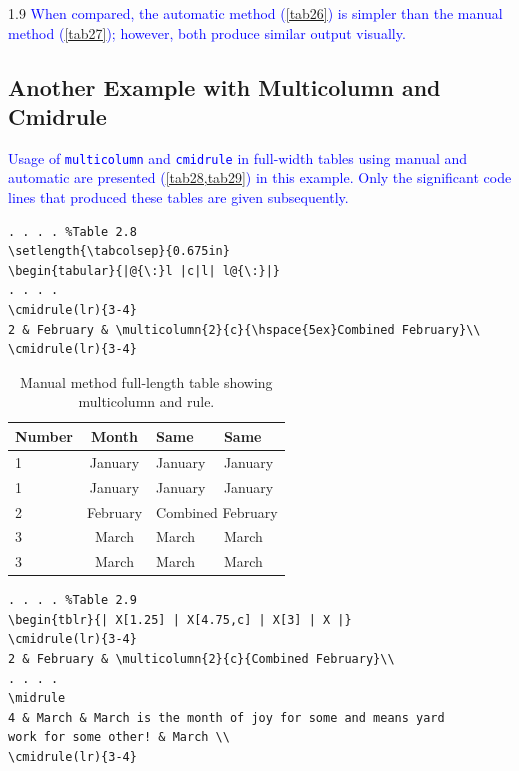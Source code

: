 \documentclass[phd]{ndsu-thesis-2022}
\newcommand\myspacing{1.9} %
\newcommand\italk[1]{\textcolor{blue}{#1}}  %
\newcommand\vb[1]{\textcolor{blue}{\texttt{#1}}}%
\begin{document}
\begin{spacing}{\myspacing}
\italk{When compared, the automatic method (\cref{tab26}) is simpler than the manual method (\cref{tab27}); however, both produce similar output visually.} 

\kant[9]
\subsection{Another Example with Multicolumn and Cmidrule}
\italk{Usage of \vb{multicolumn} and \vb{cmidrule} in full-width tables using manual and automatic are presented (\cref{tab28,tab29}) in this example. Only the significant code lines that produced these tables are given subsequently.} 

{\singlespacing
\begin{verbatim}
. . . . %Table 2.8
\setlength{\tabcolsep}{0.675in}  
\begin{tabular}{|@{\:}l |c|l| l@{\:}|} 	
. . . . 
\cmidrule(lr){3-4}
2 & February & \multicolumn{2}{c}{\hspace{5ex}Combined February}\\
\cmidrule(lr){3-4}
\end{verbatim}
}

\begin{table}[ht]
\centering
\caption{Manual method full-length table showing multicolumn and rule.}
\setlength{\tabcolsep}{0.675in}  
\begin{tabular}{|@{\:}l |c|l| l@{\:}|}
\toprule
Number & Month & Same & Same\\
\midrule
1 & January & January & January\\
1 & January & January & January\\
\cmidrule(lr){3-4}
2 & February & \multicolumn{2}{c}{\hspace{5ex}Combined February}\\
\cmidrule(lr){3-4}
3 & March & March & March \\
3 & March & March & March \\
\bottomrule
\end{tabular}
\label{tab28}
\end{table}

{\singlespacing
\begin{verbatim}
. . . . %Table 2.9
\begin{tblr}{| X[1.25] | X[4.75,c] | X[3] | X |}
\cmidrule(lr){3-4}
2 & February & \multicolumn{2}{c}{Combined February}\\
. . . .
\midrule
4 & March & March is the month of joy for some and means yard 
work for some other! & March \\
\cmidrule(lr){3-4}
\end{verbatim}
}


\end{spacing}
\end{document}
